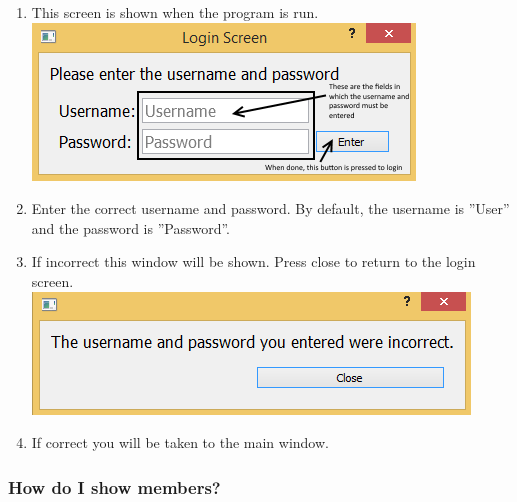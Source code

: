 \begin{enumerate}
	\item This screen is shown when the program is run.
\includegraphics[width=\textwidth]{./Manual/Images/Login1.png}
	\item Enter the correct username and password. By default, the username is ''User'' and the password is ''Password''.
	\item If incorrect this window will be shown. Press close to return to the login screen.
\includegraphics[width=\textwidth]{./Manual/Images/Login3.png}
	\item If correct you will be taken to the main window.
\end{enumerate}


\subsubsection{How do I show members?}
\label{show_member}

